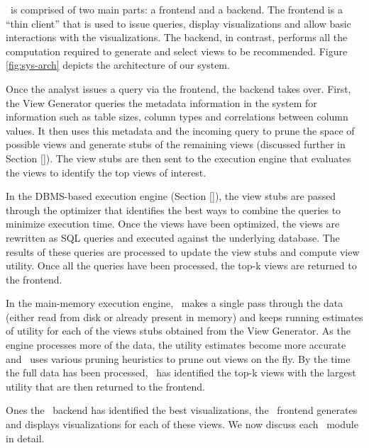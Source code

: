 \SeeDB\ is comprised of two main parts: a frontend and a backend. 
The frontend is a ``thin client''
that is used to issue queries, display visualizations  and allow basic interactions
with the visualizations. 
The backend, in contrast, performs all the computation required to generate and select views
to be recommended. 
Figure \ref{fig:sys-arch}
depicts the architecture of our system.

Once the analyst issues a query via the frontend, the backend takes over.
First, the View Generator queries the metadata information in the system for
information such as table sizes, column types and correlations between column
values. 
It then uses this metadata and the incoming query to prune the space
of possible views and generate stubs of the remaining views (discussed further
in Section \ref{}). 
The view stubs are then sent to the execution engine that evaluates the views to
identify the top views of interest.

In the DBMS-based execution engine (Section \ref{}), the view stubs are passed
through the optimizer that identifies the best ways to combine the queries to minimize
execution time.
Once the views have been optimized, the views are rewritten as SQL queries and
executed against the underlying database. 
The results of these queries are
processed to update the view stubs and compute view utility. 
Once all the queries have been processed, the top-k views are returned to the
frontend.

In the main-memory execution engine, \SeeDB\ makes a single pass through the
data (either read from disk or already present in memory) and keeps running
estimates of utility for each of the views stubs obtained from the View
Generator. 
As the engine processes more of the data, the utility estimates become more
accurate and \SeeDB\ uses various pruning heuristics to prune out views on the fly.
By the time the full data has been processed, \SeeDB\ has identified the top-k
views with the largest utility that are then returned to the frontend.

Ones the \SeeDB\ backend has identified the best visualizations, the \SeeDB\
frontend generates and displays visualizations for each of these views. We now
discuss each \SeeDB\ module in detail.
